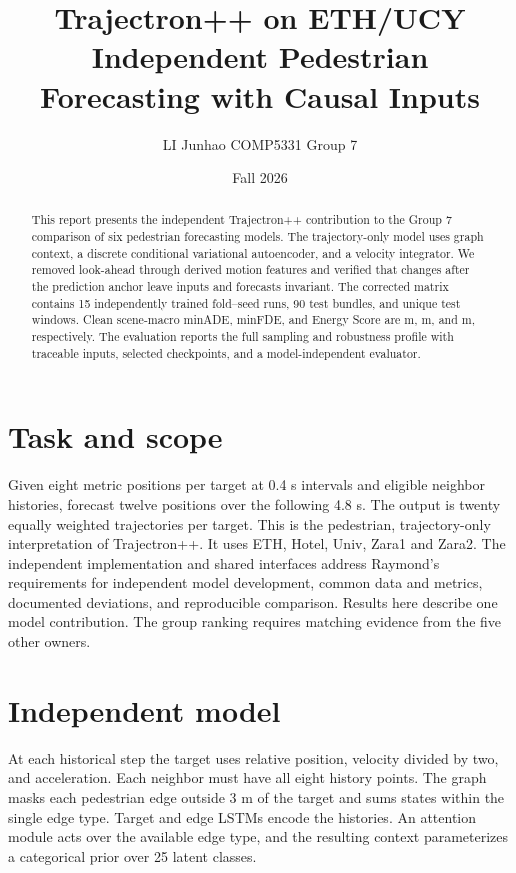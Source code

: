 \documentclass[11pt]{article}
\title{Trajectron++ on ETH/UCY\\\large Independent Pedestrian Forecasting with Causal Inputs}
\author{LI Junhao \quad COMP5331 Group 7}
\date{Fall 2026}
\begin{document}
\maketitle

\begin{abstract}
This report presents the independent Trajectron++ contribution to the Group 7
comparison of six pedestrian forecasting models. The trajectory-only model
uses graph context, a discrete conditional variational autoencoder, and a
velocity integrator. We removed look-ahead through derived motion features
and verified that changes after the prediction anchor leave inputs and
forecasts invariant. The corrected matrix contains 15 independently trained
fold--seed runs, 90 test bundles, and \TestWindows{} unique test windows.
Clean scene-macro minADE, minFDE, and Energy Score are \CleanMinADE{} m,
\CleanMinFDE{} m, and \CleanEnergy{} m, respectively. The evaluation reports
the full sampling and robustness profile with traceable inputs, selected
checkpoints, and a model-independent evaluator.
\end{abstract}

\section{Task and scope}
Given eight metric positions per target at 0.4 s intervals and eligible
neighbor histories, forecast twelve positions over the following 4.8 s.
The output is twenty equally weighted trajectories per target. This is the
pedestrian, trajectory-only interpretation of Trajectron++\cite{tpp}.
It uses ETH, Hotel, Univ, Zara1 and Zara2\cite{eth,ucy}. The independent
implementation and shared interfaces address Raymond's requirements for
independent model development, common data and metrics, documented deviations,
and reproducible comparison. Results here describe one model contribution.
The group ranking requires matching evidence from the five other owners.

\section{Independent model}
At each historical step the target uses relative position, velocity divided by
two, and acceleration. Each neighbor must have all eight history points.
The graph masks each pedestrian edge outside 3 m of the target and sums states
within the single edge type. Target and edge LSTMs encode the histories.
An attention module acts over the available edge type, and the resulting
context parameterizes a categorical prior over 25 latent classes.
\end{document}
